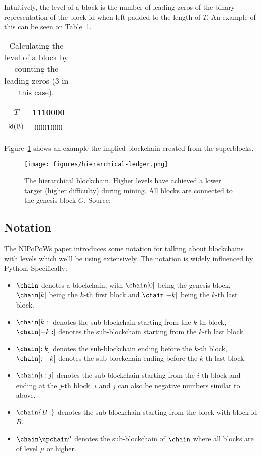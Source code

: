 Intuitively, the level of a block is the number of leading zeros of the binary representation of the block id when left padded to the length of $T$. An example of this can be seen on Table~\ref{table:level-counting}.

\begin{table}
  \centering
  \begin{tabular}{|c|c|}
    \hline
    $T$ & 1110000 \\
    \hline
    $\sf{id}(B)$ & \underline{000}1000 \\
    \hline
  \end{tabular}
  \caption{Calculating the level of a block by counting the leading zeros (3 in this case).}
  \label{table:level-counting}
\end{table}

Figure~\ref{fig:hierarchy} shows an example the implied blockchain created from the superblocks.

\begin{figure}
  \centering
  \texttt{[image: figures/hierarchical-ledger.png]}
  \caption{The hierarchical blockchain.  Higher levels have achieved a lower target (higher difficulty) during mining. All blocks are connected to the genesis block $G$. Source:~\cite{nipopows}}
  \label{fig:hierarchy}
\end{figure}

\subsection{Notation}
The NIPoPoWs paper introduces some notation for talking about blockchains with levels which we'll be using extensively. The notation is widely influenced by Python. Specifically:

\begin{itemize}
  \item $\chain$ denotes a blockchain, with $\chain[0]$ being the genesis block, $\chain[k]$ being the $k$-th first block and $\chain[-k]$ being the $k$-th last block.
  \item $\chain[k:]$ denotes the sub-blockchain starting from the $k$-th block, $\chain[-k:]$ denotes the sub-blockchain starting from the $k$-th last block.
  \item $\chain[:k]$ denotes the sub-blockchain ending before the $k$-th block, $\chain[:-k]$ denotes the sub-blockchain ending before the $k$-th last block.
  \item $\chain[i:j]$ denotes the sub-blockchain starting from the $i$-th block and ending at the $j$-th block. $i$ and $j$ can also be negative numbers similar to above.
  \item $\chain\{B:\}$ denotes the sub-blockchain starting from the block with block id $B$.
  \item $\chain\upchain^\mu$ denotes the sub-blockchain of $\chain$ where all blocks are of level $\mu$ or higher.
\end{itemize}

